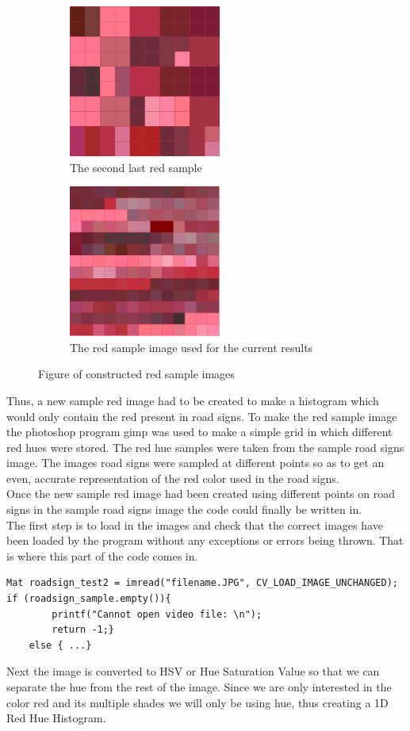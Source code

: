 \documentclass{article}
\begin{document}
\begin{figure}[H]
\begin{subfigure}{0.5\textwidth}
\includegraphics[width=0.9\linewidth, height=5cm]{ROADSIGN_samplered.png} 
\caption{The second last red sample}
\label{fig:subim1}
\end{subfigure}
\begin{subfigure}{0.5\textwidth}
\includegraphics[width=0.9\linewidth, height=5cm]{ROADSIGN_samplered2.png}
\caption{The red sample image used for the current results}
\label{fig:subim2}
\end{subfigure}
\caption{Figure of constructed red sample images}
\label{fig:image2}
\end{figure}
Thus, a new sample red image had to be created to make a histogram which would only contain the red present in road signs. To make the red sample image  the photoshop program gimp was used to make a simple grid in which different red hues were stored. The red hue samples were taken from the sample road signs image. The images road signs were sampled at different points so as to get an even, accurate representation of the red color used in the road signs.\\
Once the new sample red image had been created using different points on road signs in the sample road signs image the code could finally be written in.\\
The first step is to load in the images and check that the correct images have been loaded by the program without any exceptions or errors being thrown. That is where this part of the code comes in.
\begin{lstlisting}
Mat roadsign_test2 = imread("filename.JPG", CV_LOAD_IMAGE_UNCHANGED);
if (roadsign_sample.empty()){
		printf("Cannot open video file: \n");
		return -1;}
	else { ...}
\end{lstlisting}
Next the image is converted to HSV or Hue Saturation Value so that we can separate the hue from the rest of the image. Since we are only interested in the color red and its multiple shades we will only be using hue, thus creating a 1D Red Hue Histogram.
\end{document}
